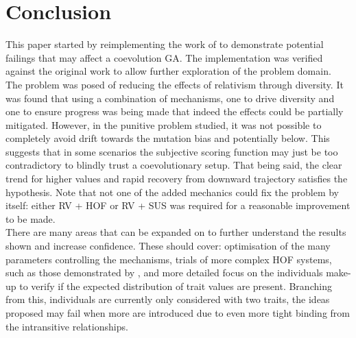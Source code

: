 \documentclass[11pt,a4paper]{article}
\begin{document}
\section{Conclusion}
This paper started by reimplementing the work of \cite{Watson:2001} to demonstrate potential failings that may affect a coevolution GA. The implementation was verified against the original work to allow further exploration of the problem domain.\\

\noindent The problem was posed of reducing the effects of relativism through diversity. It was found that using a combination of mechanisms, one to drive diversity and one to ensure progress was being made that indeed the effects could be partially mitigated. However, in the punitive problem studied, it was not possible to completely avoid drift towards the mutation bias and potentially below. This suggests that in some scenarios the subjective scoring function may just be too contradictory to blindly trust a coevolutionary setup. That being said, the clear trend for higher values and rapid recovery from downward trajectory satisfies the hypothesis. Note that not one of the added mechanics could fix the problem by itself: either RV + HOF or RV + SUS was required for a reasonable improvement to be made.\\

\noindent There are many areas that can be expanded on to further understand the results shown and increase confidence. These should cover: optimisation of the many parameters controlling the mechanisms, trials of more complex HOF systems, such as those demonstrated by \cite{Nogueira:2013}, and more detailed focus on the individuals make-up to verify if the expected distribution of trait values are present. Branching from this, individuals are currently only considered with two traits, the ideas proposed may fail when more are introduced due to even more tight binding from the intransitive relationships.


\printbibliography
\end{document}
